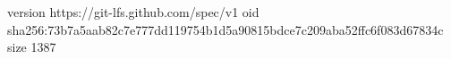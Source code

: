 version https://git-lfs.github.com/spec/v1
oid sha256:73b7a5aab82c7e777dd119754b1d5a90815bdce7c209aba52ffc6f083d67834c
size 1387
